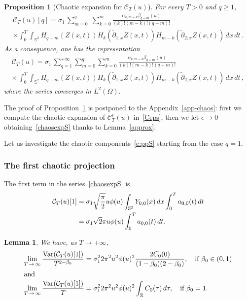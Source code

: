 \documentclass[10pt]{amsart}
\newtheorem{lemm}[theo]{Lemma}\newtheorem{prop}[theo]{Proposition}\newtheorem{coro}[theo]{Corollary}\newtheorem{conj}[theo]{Conjecture}
\theoremstyle{definition}\newtheorem{defi}[theo]{Definition}\newtheorem{rema}[theo]{Remark}\newtheorem{exam}[theo]{Example}\newtheorem{exem}[theo]{Example}\newtheorem{nota}[theo]{Notation}
\newcommand{\clC}{\mathcal{C}}
\newcommand{\bbS}{\mathbb{S}}
\newcommand{\bbR}{\mathbb{R}}
\DeclareMathOperator{\Var}{Var}
\begin{document}
\begin{prop}[Chaotic expansion for $\clC_T(u)$]\label{teoexpS}
For every $T>0$ and $q\geq 1$,
\begin{multline} \label{e:ppS}
\clC_T(u)[q] = \sigma_1 \,\sum_{m=0}^{q}\;
\sum_{k=0}^{m} \frac{\alpha _{k,m-k}\beta_{q-m}(u) }{(k)!(m-k)!(q-m)!}\\
\times \int_0^T \int_{\bbS^2} H_{q-m}(Z(x,t)) H_{k}\left(\widetilde\partial_{1;x} Z(x,t)\right)H_{m-k}\left(\widetilde\partial_{2;x} Z(x,t)\right)\,dx\,dt\,.
\end{multline}
As a consequence, one has the representation
\begin{multline}\label{chaosexpS}
\clC_T(u) =\sigma_1\,\sum_{q=1}^{+\infty}
\sum_{m=0}^{q}\sum_{k=0}^{m} \frac{\alpha _{k,m-k}\beta _{q-m}(u)}{ (k)!(m-k)!(q-m)!} \,\\
\times\, \int_0^T\int_{\bbS^2}\!\! H_{q-m}(Z(x,t))H_{k}\left(\widetilde\partial_{1;x} Z(x,t)\right)H_{m-k}\left(\widetilde{\partial} _{2;x} Z(x,t)\right)\,dx\,dt\,,
\end{multline}
where the series converges in $L^2(\Omega)$.
\end{prop}

The proof of Proposition~\ref{teoexpS} is postponed to the Appendix~\ref{app-chaos}: first we compute the chaotic expansion of $\clC^\epsilon_T(u)$ in~\eqref{Ceps}, then we let $\epsilon\to 0$ obtaining~\eqref{chaosexpS} thanks to Lemma~\ref{approx}.

Let us investigate the chaotic components~\eqref{e:ppS} starting from the case $q=1$.

\subsubsection{The first chaotic projection}

The first term in the series~\eqref{chaosexpS} is
\begin{equation}
\begin{split}
\clC_T(u)[1] &= \sigma_1 \sqrt{\frac{\pi}{2}} u\phi(u) \int_{\bbS^2}Y_{0,0}(x)\,dx \int_0^T a_{0,0}(t)\,dt \notag \\
&= \sigma_1 \sqrt 2 \pi u\phi(u) \int_0^T a_{0,0}(t)\,dt.
\end{split}
\end{equation}

\begin{lemm}\label{lemvar1}
We have, as $T\to +\infty$,
\begin{align*}
\lim_{T\,\to\,\infty} \frac{\Var(\clC_T(u)[1])}{T^{2-\beta_0}} &= \sigma_1^2 2\pi^2 u^2 \phi(u)^2\frac{2C_0(0)}{(1-\beta_0)(2-\beta_0)},\quad \text{if } \beta_0\in (0,1)
\\
\intertext{and}
\lim_{T\,\to\,\infty}\frac{\Var(\clC_T(u)[1])}{T} &=
\sigma_1^2 2\pi^2 u^2\phi(u)^2 \int_{\bbR} C_0(\tau)\,d\tau,\quad
\text{if }\beta_0=1.
\end{align*}
\end{lemm}
\end{document}
